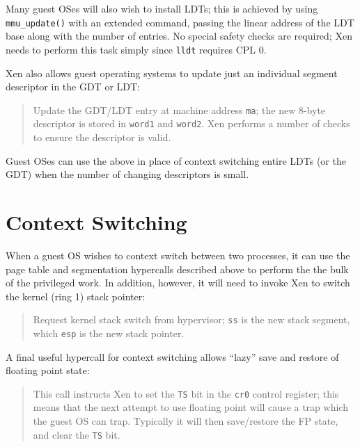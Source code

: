 \documentclass[11pt,twoside,final,openright]{report}
\begin{document}
Many guest OSes will also wish to install LDTs; this is achieved by
using {\tt mmu\_update()} with an extended command, passing the
linear address of the LDT base along with the number of entries. No
special safety checks are required; Xen needs to perform this task
simply since {\tt lldt} requires CPL 0.


Xen also allows guest operating systems to update just an 
individual segment descriptor in the GDT or LDT:  

\begin{quote}

Update the GDT/LDT entry at machine address {\tt ma}; the new
8-byte descriptor is stored in {\tt word1} and {\tt word2}.
Xen performs a number of checks to ensure the descriptor is 
valid. 

\end{quote}

Guest OSes can use the above in place of context switching entire 
LDTs (or the GDT) when the number of changing descriptors is small. 

\section{Context Switching} 

When a guest OS wishes to context switch between two processes, 
it can use the page table and segmentation hypercalls described
above to perform the the bulk of the privileged work. In addition, 
however, it will need to invoke Xen to switch the kernel (ring 1) 
stack pointer: 

\begin{quote} 

Request kernel stack switch from hypervisor; {\tt ss} is the new 
stack segment, which {\tt esp} is the new stack pointer. 

\end{quote} 

A final useful hypercall for context switching allows ``lazy'' 
save and restore of floating point state: 

\begin{quote}

This call instructs Xen to set the {\tt TS} bit in the {\tt cr0}
control register; this means that the next attempt to use floating
point will cause a trap which the guest OS can trap. Typically it will
then save/restore the FP state, and clear the {\tt TS} bit. 
\end{quote} 
\end{document}
